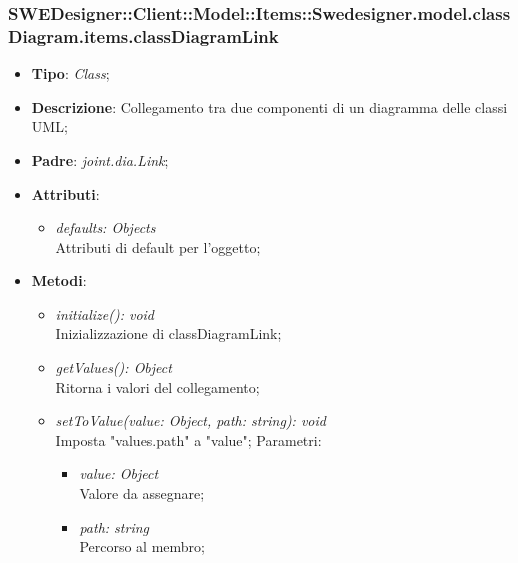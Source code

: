 \documentclass[../DefinizioneDiProdotto.tex]{subfiles}
\begin{document}
			\subsubsection{SWEDesigner::Client::Model::Items::Swedesigner.model.classDiagram.items.classDiagramLink}
			\hypertarget{SWEDesigner::Client::Model::Items::Swedesigner.model.classDiagram.items.classDiagramLink}{}
			\begin{itemize}
				\item \textbf{Tipo}: \emph{Class};
				\item \textbf{Descrizione}: Collegamento tra due componenti di un diagramma delle classi UML;
				\item \textbf{Padre}: \emph{joint.dia.Link};
				\item \textbf{Attributi}:
				\begin{itemize}
					\item \emph{defaults: Objects}\\
					Attributi di default per l'oggetto;
				\end{itemize}
				\item \textbf{Metodi}:
				\begin{itemize}
					\item \emph{initialize(): void}\\
					Inizializzazione di classDiagramLink;
					\item \emph{getValues(): Object}\\
					Ritorna i valori del collegamento;
					\item \emph{setToValue(value: Object, path: string): void}\\
					Imposta "values.path" a "value";
					Parametri:
					\begin{itemize}
						\item \emph{value: Object} \\
						Valore da assegnare;
						\item \emph{path: string} \\
						Percorso al membro;
					\end{itemize}
				\end{itemize}
			\end{itemize}
			
\end{document}
